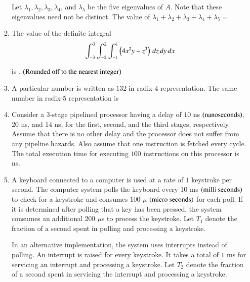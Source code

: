\documentclass[journal,12pt,onecolumn]{IEEEtran}
\theoremstyle{remark}
\begin{document}
\begin{enumerate}
		Let $\lambda_1, \lambda_2, \lambda_3, \lambda_4$, and $\lambda_5$ be the five eigenvalues of $A$. Note that these eigenvalues need not be distinct.
		The value of $\lambda_1 + \lambda_2 + \lambda_3 + \lambda_4 + \lambda_5 = $ \underline{\hspace{2cm}}
		
		\hfill{}
		
		\item The value of the definite integral
		$$\int_{-3}^{3} \int_{-2}^{2} \int_{-1}^{1} \left(4x^2 y - z^3\right) \, dz \, dy \, dx$$
		
		is \underline{\hspace{2cm}}. $\left(\text{Rounded off to the nearest integer}\right)$
		
		\hfill{}
		
		\item A particular number is written as $132$ in radix-$4$ representation. The same number in radix-$5$ representation is \underline{\hspace{2cm}}
		
		\hfill{}
		
		\item Consider a $3$-stage pipelined processor having a delay of $10$ ns $\left(\text{nanoseconds}\right)$, $20$ ns, and $14$ ns, for the first, second, and the third stages, respectively. Assume that there is no other delay and the processor does not suffer from any pipeline hazards. Also assume that one instruction is fetched every cycle.
		The total execution time for executing $100$ instructions on this processor is \underline{\hspace{2cm}} ns.
		
		\hfill{}
		
		\item A keyboard connected to a computer is used at a rate of $1$ keystroke per second. The computer system polls the keyboard every $10$ ms $\left(\text{milli seconds}\right)$ to check for a keystroke and consumes $100$ $\mu$ $\left(\text{micro seconds}\right)$ for each poll. If it is determined after polling that a key has been pressed, the system consumes an additional $200$ $\mu$s to process the keystroke. Let $T_1$ denote the fraction of a second spent in polling and processing a keystroke.
		
		In an alternative implementation, the system uses interrupts instead of polling. An interrupt is raised for every keystroke. It takes a total of $1$ ms for servicing an interrupt and processing a keystroke. Let $T_2$ denote the fraction of a second spent in servicing the interrupt and processing a keystroke.
		

\end{enumerate}
\end{document}
